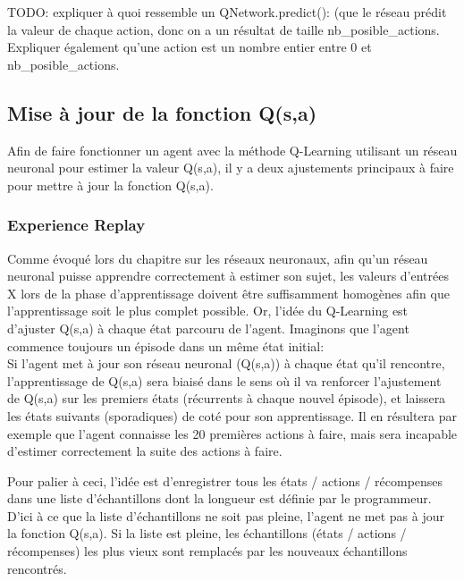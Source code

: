 \documentclass[11pt,a4paper]{report}
\begin{document}
   
   \par TODO: expliquer à quoi ressemble un QNetwork.predict(): (que le réseau prédit la valeur de chaque action, donc on a un résultat de taille nb\_posible\_actions. Expliquer également qu'une action est un nombre entier entre 0 et nb\_posible\_actions. 

  \subsection{Mise à jour de la fonction Q(s,a)}
  
   \par Afin de faire fonctionner un agent avec la méthode Q-Learning utilisant un réseau neuronal pour estimer la valeur Q(s,a), il y a deux ajustements principaux à faire pour mettre à jour la fonction Q(s,a). 
  
  \subsubsection{Experience Replay}
  
  \par Comme évoqué lors du chapitre sur les réseaux neuronaux, afin qu'un réseau neuronal puisse apprendre correctement à estimer son sujet, les valeurs d'entrées X lors de la phase d'apprentissage doivent être suffisamment homogènes afin que l'apprentissage soit le plus complet possible. Or, l'idée du Q-Learning est d'ajuster Q(s,a) à chaque état parcouru de l'agent. Imaginons que l'agent commence toujours un épisode dans un même état initial: \\
  Si l'agent met à jour son réseau neuronal (Q(s,a)) à chaque état qu'il rencontre, l'apprentissage de Q(s,a) sera biaisé dans le sens où il va renforcer l'ajustement de Q(s,a) sur les premiers états (récurrents à chaque nouvel épisode), et laissera les états suivants (sporadiques) de coté pour son apprentissage. Il en résultera par exemple que l'agent connaisse les 20 premières actions à faire, mais sera incapable d'estimer correctement la suite des actions à faire. 
  
  \par Pour palier à ceci, l'idée est d'enregistrer tous les états / actions / récompenses dans une liste d'échantillons dont la longueur est définie par le programmeur. D'ici à ce que la liste d'échantillons ne soit pas pleine, l'agent ne met pas à jour la fonction Q(s,a). Si la liste est pleine, les échantillons (états / actions / récompenses) les plus vieux sont remplacés par les nouveaux échantillons rencontrés. 
  
\end{document}
